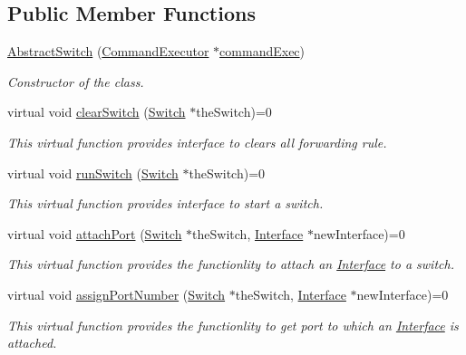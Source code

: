 \subsection*{\-Public \-Member \-Functions}
\begin{DoxyCompactItemize}
\item 
\hyperlink{classAbstractSwitch_a7d6e522a66f892b13d2955fdb4120d56}{\-Abstract\-Switch} (\hyperlink{classCommandExecutor}{\-Command\-Executor} $\ast$\hyperlink{classAbstractSwitch_af301a644b47e434e8acf1b78e3033378}{command\-Exec})
\begin{DoxyCompactList}\small\item\em \-Constructor of the class. \end{DoxyCompactList}\item 
virtual void \hyperlink{classAbstractSwitch_a96b9e50771056ef9aff1ce123581ab36}{clear\-Switch} (\hyperlink{classSwitch}{\-Switch} $\ast$the\-Switch)=0
\begin{DoxyCompactList}\small\item\em \-This virtual function provides interface to clears all forwarding rule. \end{DoxyCompactList}\item 
virtual void \hyperlink{classAbstractSwitch_af520e5d2dde92c356449f499651cdf54}{run\-Switch} (\hyperlink{classSwitch}{\-Switch} $\ast$the\-Switch)=0
\begin{DoxyCompactList}\small\item\em \-This virtual function provides interface to start a switch. \end{DoxyCompactList}\item 
virtual void \hyperlink{classAbstractSwitch_ab689ab85b45f96833d5d124667ccca83}{attach\-Port} (\hyperlink{classSwitch}{\-Switch} $\ast$the\-Switch, \hyperlink{classInterface}{\-Interface} $\ast$new\-Interface)=0
\begin{DoxyCompactList}\small\item\em \-This virtual function provides the functionlity to attach an \hyperlink{classInterface}{\-Interface} to a switch. \end{DoxyCompactList}\item 
virtual void \hyperlink{classAbstractSwitch_af61a5421837dc8619fe4042746c1dd6d}{assign\-Port\-Number} (\hyperlink{classSwitch}{\-Switch} $\ast$the\-Switch, \hyperlink{classInterface}{\-Interface} $\ast$new\-Interface)=0
\begin{DoxyCompactList}\small\item\em \-This virtual function provides the functionlity to get port to which an \hyperlink{classInterface}{\-Interface} is attached. \end{DoxyCompactList}\item 

\end{DoxyCompactItemize}
